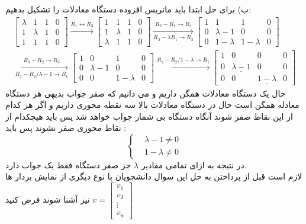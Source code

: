 \documentclass{article}
\begin{document}
ب) برای حل ابتدا باید ماتریس افزوده دستگاه معادلات را تشکیل بدهیم:
\begin{gather*}
\begin{bmatrix}
\lambda&1&1&0\\
1&\lambda&1&0\\
1&1&1&0
\end{bmatrix}\xrightarrow{R_1\leftrightarrow R_3}
\begin{bmatrix}
1&1&1&0\\
1&\lambda&1&0\\
\lambda&1&1&0
\end{bmatrix}\xrightarrow[R_3-\lambda R_1\to R_3]{R_2-R_1\to R_2}
\begin{bmatrix}
1&1&1&0\\
0&\lambda-1&0&0\\
0&1-\lambda&1-\lambda&0
\end{bmatrix}\\
\xrightarrow[R_1-R_2/\lambda-1\to R_1]{R_3-R_2\to R_3}
\begin{bmatrix}
1&0&1&0\\
0&\lambda-1&0&0\\
0&0&1-\lambda&0
\end{bmatrix}\xrightarrow{R_1-R_2/1-\lambda\to R_1}
\begin{bmatrix}
\underline{1}&0&0&0\\
0&\underline{\lambda-1}&0&0\\
0&0&\underline{1-\lambda}&0
\end{bmatrix}
\end{gather*}
حال یک دستگاه معادلات همگن داریم و می دانیم که صفر جواب بدیهی هر دستگاه معادله همگن است حال در دستگاه معادلات بالا سه نقطه محوری داریم و اگر هر کدام از این نقاط صفر شوند آنگاه دستگاه بی شمار جواب خواهد شد پس باید هیچکدام از نقاط محوری صفر نشوند پس باید :
\begin{equation*}
\left\{
\begin{array}{rl}
&\lambda-1\neq0\\
&1-\lambda\neq0
\end{array} \right.
\end{equation*}
در نتیجه به ازای تمامی مقادیر 
$\lambda$
جز صفر دستگاه فقط یک جواب دارد.
\\
لازم است قبل از پرداختن به حل این سوال دانشجویان با نوع دیگری از نمایش بردار ها نیز آشنا شوند فرض کنید 
$v=\begin{bmatrix}
v_1\\
v_2\\
\vdots\\
v_n
\end{bmatrix}$
\end{document}
